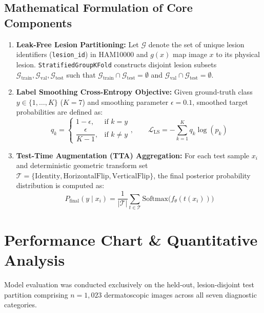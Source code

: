 \documentclass[12pt,a4paper]{article}
\begin{document}
\subsection{Mathematical Formulation of Core Components}
\begin{enumerate}[leftmargin=*]
    \item \textbf{Leak-Free Lesion Partitioning:} Let $\mathcal{G}$ denote the set of unique lesion identifiers (\texttt{lesion\_id}) in HAM10000 and $g(x)$ map image $x$ to its physical lesion. \texttt{StratifiedGroupKFold} constructs disjoint lesion subsets $\mathcal{G}_{\text{train}}, \mathcal{G}_{\text{val}}, \mathcal{G}_{\text{test}}$ such that $\mathcal{G}_{\text{train}} \cap \mathcal{G}_{\text{test}} = \emptyset$ and $\mathcal{G}_{\text{val}} \cap \mathcal{G}_{\text{test}} = \emptyset$.
    \item \textbf{Label Smoothing Cross-Entropy Objective:} Given ground-truth class $y \in \{1, \dots, K\}$ ($K = 7$) and smoothing parameter $\epsilon = 0.1$, smoothed target probabilities are defined as:
    \begin{equation}
        q_k = \begin{cases} 1 - \epsilon, & \text{if } k = y \\ \dfrac{\epsilon}{K - 1}, & \text{if } k \neq y \end{cases}, \qquad \mathcal{L}_{\text{LS}} = -\sum_{k=1}^{K} q_k \log(p_k)
    \end{equation}
    \item \textbf{Test-Time Augmentation (TTA) Aggregation:} For each test sample $x_i$ and deterministic geometric transform set $\mathcal{T} = \{\text{Identity}, \text{HorizontalFlip}, \text{VerticalFlip}\}$, the final posterior probability distribution is computed as:
    \begin{equation}
        P_{\text{final}}(y \mid x_i) = \frac{1}{|\mathcal{T}|} \sum_{t \in \mathcal{T}} \text{Softmax}\big(f_\theta(t(x_i))\big)
    \end{equation}
\end{enumerate}

\section{Performance Chart \& Quantitative Analysis}
Model evaluation was conducted exclusively on the held-out, lesion-disjoint test partition comprising $n = 1,023$ dermatoscopic images across all seven diagnostic categories.
\end{document}
